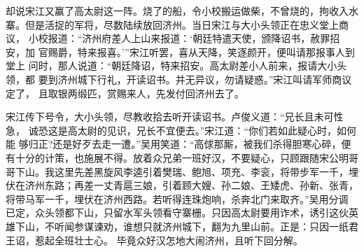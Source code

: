 却说宋江又赢了高太尉这一阵。烧了的船，令小校搬运做柴，不曾烧的，拘收入水
寨。但是活捉的军将，尽数陆续放回济州。当日宋江与大小头领正在忠义堂上商议，
小校报道：“济州府差人上山来报道：‘朝廷特遣天使，颁降诏书，赦罪招安，加
官赐爵，特来报喜。’”宋江听罢，喜从天降，笑逐颜开，便叫请那报事人到堂上
问时，那人说道：“朝廷降诏，特来招安。高太尉差小人前来，报请大小头领，都
要到济州城下行礼，开读诏书。并无异议，勿请疑惑。”宋江叫请军师商议定了，
且取银两缎匹，赏赐来人，先发付回济州去了。

宋江传下号令，大小头领，尽教收拾去听开读诏书。卢俊义道：“兄长且未可性急，
诚恐这是高太尉的见识，兄长不宜便去。”宋江道：“你们若如此疑心时，如何能
够归正?还是好歹去走一遭。”吴用笑道：“高俅那厮，被我们杀得胆寒心碎，便
有十分的计策，也施展不得。放着众兄弟一班好汉，不要疑心，只顾跟随宋公明哥
哥下山。我这里先差黑旋风李逵引着樊瑞、鲍旭、项充、李衮，将带步军一千，埋
伏在济州东路；再差一丈青扈三娘，引着顾大嫂、孙二娘、王矮虎、孙新、张青，
将带马军一千，埋伏在济州西路。若听得连珠炮响，杀奔北门来取齐。”吴用分调
已定，众头领都下山，只留水军头领看守寨栅。只因高太尉要用诈术，诱引这伙英
雄下山，不听闻参谋谏劝，谁想只就济州城下，翻为九里山前。正是：只因一纸君
王诏，惹起全班壮士心。
毕竟众好汉怎地大闹济州，且听下回分解。